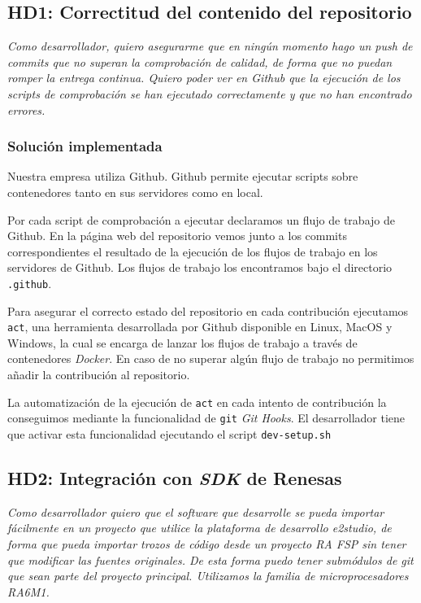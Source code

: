 \subsection{HD1: Correctitud del contenido del repositorio}

\textit{Como desarrollador, quiero asegurarme que en ningún
momento hago un push de commits que no superan
la comprobación de calidad, de forma que no puedan
romper la entrega continua. Quiero poder ver en Github
que la ejecución de los scripts de comprobación se han
ejecutado correctamente y que no han encontrado errores.}

\subsubsection{Solución implementada}

Nuestra empresa utiliza Github. Github permite ejecutar
scripts sobre contenedores tanto en sus servidores como
en local.

Por cada script de comprobación a ejecutar declaramos
un flujo de trabajo de Github. En la página web del
repositorio vemos junto a los commits correspondientes
el resultado de la ejecución de los flujos de trabajo
en los servidores de Github.
Los flujos de trabajo los encontramos bajo el directorio
\texttt{.github}.

Para asegurar el correcto estado del repositorio en cada
contribución ejecutamos \texttt{act}, una herramienta
desarrollada por Github disponible en Linux, MacOS y Windows,
la cual se encarga de lanzar los flujos de trabajo
a través de contenedores \textit{Docker}. En caso de
no superar algún flujo de trabajo no permitimos añadir
la contribución al repositorio.

La automatización de la ejecución de \texttt{act} en cada
intento de contribución la conseguimos mediante la funcionalidad
de \texttt{git} \textit{Git Hooks}. El desarrollador tiene
que activar esta funcionalidad ejecutando el script \texttt{dev-setup.sh}

\subsection{HD2: Integración con \textit{SDK} de Renesas}

\textit{Como desarrollador quiero que el software que desarrolle
se pueda importar fácilmente en un proyecto que utilice
la plataforma de desarrollo \textit{e2studio}, de forma que pueda
importar trozos de código desde un proyecto \textit{RA FSP}
sin tener que modificar las fuentes originales. De esta forma puedo
tener submódulos de git que sean parte del proyecto principal.
Utilizamos la familia de microprocesadores RA6M1.}

